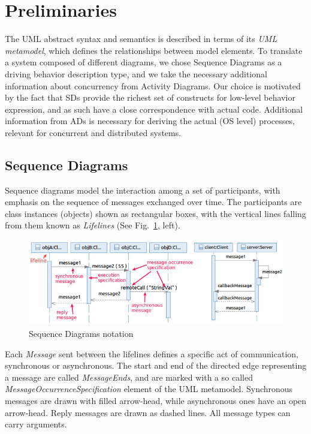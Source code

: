 \documentclass[letter]{llncs}
\newcommand{\figshrink}{\vspace{-.6cm}}
\newcommand{\figshrinkend}{}
\newcommand{\secshrinkbegin}{\vspace{-.2cm}}
\newcommand{\subsecshrink}{\vspace{-.5cm}}
\newcommand{\subsecshrinkbegin}{\vspace{-.2cm}}
\begin{document}
\section{Preliminaries}
\label{sec:Preliminaries}
\secshrinkbegin
\vspace{-6 pt}
The UML abstract syntax and semantics is described in terms of its \emph{UML metamodel},
which defines the relationships between model elements.
To translate a system composed of different diagrams, we chose Sequence 
Diagrams as a driving behavior description type, and we take the necessary additional information about concurrency
from Activity Diagrams. Our choice is motivated by the fact that SDs provide the richest set of constructs 
for low-level behavior expression, and as such have a close correspondence with actual code. 
Additional information from ADs is necessary for deriving the actual (OS level) processes,
relevant for concurrent and distributed systems. 
\subsecshrink
\subsection{Sequence Diagrams}
\label{sec:SDs}
\subsecshrinkbegin
Sequence diagrams model the interaction among a set of participants, with emphasis on the sequence of messages exchanged over time. 
The participants are class instances (objects) shown as rectangular boxes, with the vertical lines falling from them
known as \emph{Lifelines} (See Fig.~\ref{fig:example1}, left). 
\begin{figure}[!t]
\centering
\figshrink
\includegraphics[width=1.0\linewidth,keepaspectratio=true]{./Figure1_newNew.png}
\caption{Sequence Diagrams notation}
\label{fig:example1}
\figshrinkend
\end{figure}
Each \emph{Message} sent between the lifelines defines a specific act of communication, synchronous or asynchronous. 
The start and end of the directed edge representing a message are called \emph{MessageEnds}, and are marked with 
a so called \emph{MessageOccurrenceSpecification} element of the UML metamodel.
Synchronous messages are drawn with filled arrow-head, while asynchronous ones have an open arrow-head.
Reply messages are drawn as dashed lines. All message types can carry arguments.
\end{document}

